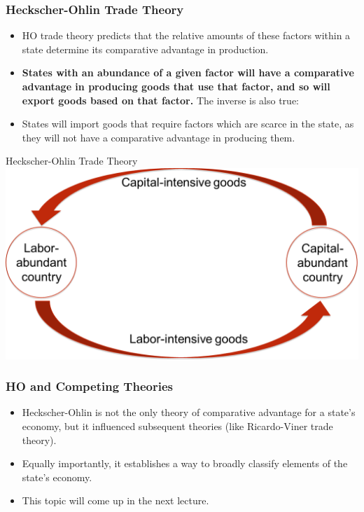 \documentclass{beamer}
\begin{document}
\begin{frame} 
	\frametitle{\LARGE{Heckscher-Ohlin Trade Theory}}
	\begin{itemize}
		\item HO trade theory predicts that the relative amounts of these factors within a state determine its comparative advantage in production. \pause
		\item \textbf{States with an abundance of a given factor will have a comparative advantage in producing goods that use that factor, and so will export goods based on that factor.} The inverse is also true: \pause
		\item States will import goods that require factors which are scarce in the state, as they will not have a comparative advantage in producing them. 
	\end{itemize}
\end{frame}

\begin{frame}{\LARGE Heckscher-Ohlin Trade Theory}
	\centering
	\includegraphics[width=\textwidth,height=0.8\textheight,keepaspectratio]{HOillustration.png}
\end{frame}

\begin{frame} 
	\frametitle{\LARGE{HO and Competing Theories}}
	\begin{itemize}
		\item Heckscher-Ohlin is not the only theory of comparative advantage for a state's economy, but it influenced subsequent theories (like Ricardo-Viner trade theory). \pause
		\item Equally importantly, it establishes a way to broadly classify elements of the state's economy. \pause
		\item This topic will come up in the next lecture.
	\end{itemize}
\end{frame}
\end{document}

